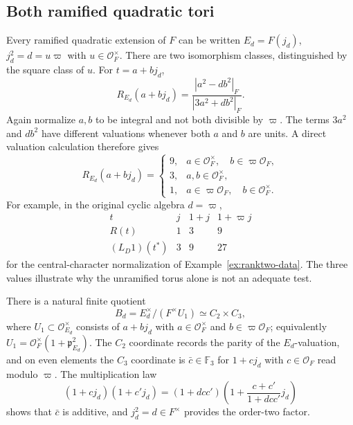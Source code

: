 \documentclass[11pt]{article}
\theoremstyle{plain}
\theoremstyle{definition}
\begin{document}
\subsection{Both ramified quadratic tori}
Every ramified quadratic extension of $F$ can be written
$E_d=F(j_d)$, $j_d^2=d=u\varpi$ with $u\in\mathcal O_F^\times$.
There are two isomorphism classes, distinguished by the square
class of $u$.  For $t=a+bj_d$,
\begin{equation}\label{eq:ramified-R}
 R_{E_d}(a+bj_d)
 =\frac{|a^2-db^2|_F}{|3a^2+db^2|_F}.
\end{equation}
Again normalize $a,b$ to be integral and not both divisible
by $\varpi$.  The terms $3a^2$ and $db^2$ have different
valuations whenever both $a$ and $b$ are units.  A direct
valuation calculation therefore gives
\begin{equation}\label{eq:ramified-values}
 R_{E_d}(a+bj_d)=
 \begin{cases}
 9,& a\in\mathcal O_F^\times,
       \quad b\in\varpi\mathcal O_F,\\
 3,& a,b\in\mathcal O_F^\times,\\
 1,& a\in\varpi\mathcal O_F,
       \quad b\in\mathcal O_F^\times.
 \end{cases}
\end{equation}
For example, in the original cyclic algebra $d=\varpi$,
\[
 \begin{array}{c|ccc}
 t&j&1+j&1+\varpi j\\\hline
 R(t)&1&3&9\\
 (L_D1)(t^*)&3&9&27
 \end{array}
\]
for the central-character normalization of Example~\ref{ex:ranktwo-data}.
The three values illustrate why the unramified torus alone is not
an adequate test.

There is a natural finite quotient
\[
 B_d=E_d^\times/(F^\times U_1)\simeq C_2\times C_3,
\]
where $U_1\subset\mathcal O_{E_d}^\times$ consists of
$a+bj_d$ with $a\in\mathcal O_F^\times$ and
$b\in\varpi\mathcal O_F$; equivalently
$U_1=\mathcal O_F^\times(1+\mathfrak p_{E_d}^2)$.  The $C_2$ coordinate
records the parity of the $E_d$-valuation, and on even elements
the $C_3$ coordinate is $\bar c\in\mathbb F_3$ for
$1+cj_d$ with $c\in\mathcal O_F$ read modulo $\varpi$.  The multiplication law
\[
 (1+cj_d)(1+c'j_d)
 =(1+dcc')\left(1+\frac{c+c'}{1+dcc'}j_d\right)
\]
shows that $\bar c$ is additive, and $j_d^2=d\in F^\times$
provides the order-two factor.
\end{document}
